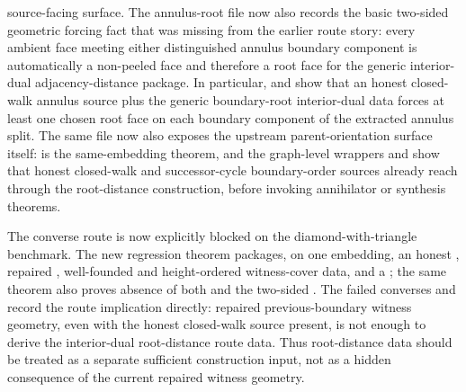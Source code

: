 \documentclass[11pt]{article}
\begin{document}
source-facing surface.
The annulus-root file now also records the basic two-sided geometric forcing
fact that was missing from the earlier route story: every ambient face meeting
either distinguished annulus boundary component is automatically a non-peeled
face and therefore a root face for the generic interior-dual adjacency-distance
package.  In particular,
and
show that an honest closed-walk annulus source plus the generic
boundary-root interior-dual data forces at least one chosen root face on each
boundary component of the extracted annulus split.
The same file now also exposes the upstream parent-orientation surface itself:
is the same-embedding theorem, and the graph-level wrappers
and
show that honest closed-walk and successor-cycle boundary-order sources already
reach 
through the root-distance construction, before invoking annihilator or
synthesis theorems.

The converse route is now explicitly blocked on the diamond-with-triangle
benchmark.  The new regression theorem
packages, on one embedding, an honest
, repaired
, well-founded and
height-ordered witness-cover data, and a
; the same theorem also proves absence of both
 and the two-sided
.  The failed converses
and
record the route implication directly: repaired previous-boundary witness
geometry, even with the honest closed-walk source present, is not enough to
derive the interior-dual root-distance route data.  Thus root-distance data
should be treated as a separate sufficient construction input, not as a hidden
consequence of the current repaired witness geometry.
\end{document}
